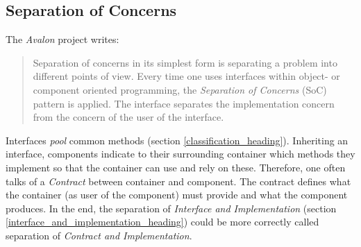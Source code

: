 %
%
%
%
%
%
%

\subsection{Separation of Concerns}
\label{separation_of_concerns_heading}

The \emph{Avalon} project \cite{avalon} writes:

\begin{quote}
    Separation of concerns in its simplest form is separating a problem into
    different points of view. Every time one uses interfaces within object- or
    component oriented programming, the \emph{Separation of Concerns} (SoC)
    pattern is applied. The interface separates the implementation concern from
    the concern of the user of the interface.
\end{quote}

Interfaces \emph{pool} common methods (section \ref{classification_heading}).
Inheriting an interface, components indicate to their surrounding container
which methods they implement so that the container can use and rely on these.
Therefore, one often talks of a \emph{Contract} between container and
component. The contract defines what the container (as user of the component)
must provide and what the component produces. In the end, the separation of
\emph{Interface and Implementation} (section
\ref{interface_and_implementation_heading}) could be more correctly called
separation of \emph{Contract and Implementation}.

